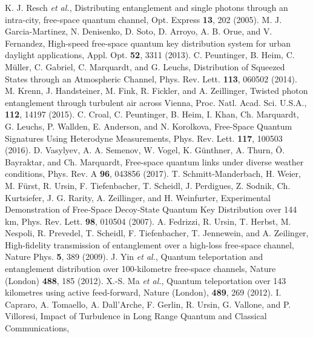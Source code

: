 \documentclass[aps,pra,twocolumn,a4paper,nofootinbib,preprintnumbers] {revtex4-1}
\begin{document}


\begin{thebibliography}{99}

	K. J. Resch \textit{et al.},
	Distributing entanglement and single photons through an intra-city, free-space quantum channel,
	Opt. Express \textbf{13}, 202 (2005).
	M. J. Garcia-Martinez, N. Denisenko, D. Soto, D. Arroyo, A. B. Orue, and V. Fernandez,
	High-speed free-space quantum key distribution system for urban daylight applications,
	Appl. Opt. \textbf{52}, 3311 (2013).
	C. Peuntinger, B. Heim, C. M\"uller, C. Gabriel, C. Marquardt, and G. Leuchs,
	Distribution of Squeezed States through an Atmospheric Channel,
	Phys. Rev. Lett. \textbf{113}, 060502 (2014).
	M. Krenn, J. Handsteiner, M. Fink, R. Fickler, and A. Zeillinger,
	Twisted photon entanglement through turbulent air across Vienna,
	Proc. Natl. Acad. Sci. U.S.A., \textbf{112}, 14197 (2015).
	C. Croal, C. Peuntinger, B. Heim, I. Khan, Ch. Marquardt, G. Leuchs, P. Wallden, E. Anderson, and N. Korolkova, Free-Space Quantum Signatures Using Heterodyne Measurements,
	Phys. Rev. Lett. \textbf{117}, 100503 (2016).
	D. Vasylyev, A. A. Semenov, W. Vogel, K. G\"unthner, A. Thurn, \"O. Bayraktar, and Ch. Marquardt,
	Free-space quantum links under diverse weather conditions,
	Phys. Rev. A \textbf{96}, 043856 (2017).
	T. Schmitt-Manderbach, H. Weier, M. F\"urst, R. Ursin, F. Tiefenbacher, T. Scheidl, J. Perdigues, Z. Sodnik, Ch. Kurtsiefer, J. G. Rarity, A. Zeillinger, and H. Weinfurter,
	Experimental Demonstration of Free-Space Decoy-State Quantum Key Distribution over 144 km,
	Phys. Rev. Lett. \textbf{98}, 010504 (2007).
	A. Fedrizzi, R. Ursin, T. Herbst, M. Nespoli, R. Prevedel, T. Scheidl, F. Tiefenbacher, T. Jennewein, and A. Zeilinger,
	High-fidelity transmission of entanglement over a high-loss free-space channel,
	Nature Phys. \textbf{5}, 389 (2009).
	J. Yin \textit{et al.},
	Quantum teleportation and entanglement distribution over 100-kilometre free-space channels,
	Nature (London) \textbf{488}, 185 (2012).
	X.-S. Ma \textit{ et al.},
	Quantum teleportation over 143 kilometres using active feed-forward,
	Nature (London), \textbf{489}, 269 (2012).
	I. Capraro, A. Tomaello, A. Dall'Arche, F. Gerlin, R. Ursin, G. Vallone, and P. Villoresi,
	Impact of Turbulence in Long Range Quantum and Classical Communications,

\end{thebibliography}
\end{document}
